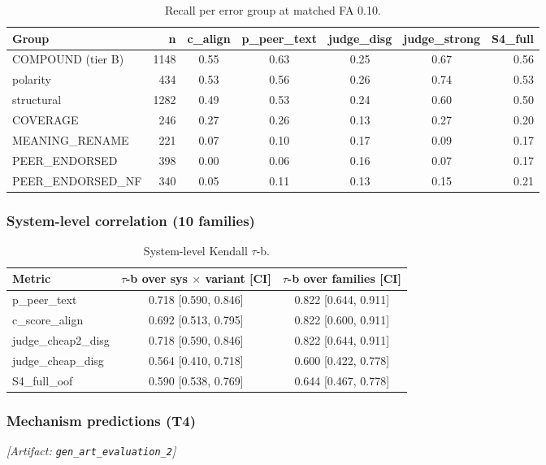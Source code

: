 \documentclass[11pt,letterpaper]{article}
\begin{document}
\begin{table}[!htbp]
\centering
\caption{Recall per error group at matched FA 0.10.}
\label{tab:recall_errorgroup}
\small
\begin{tabular}{lrccccr}
\toprule
Group & n & c\_align & p\_peer\_text & judge\_disg & judge\_strong & S4\_full \\
\midrule
COMPOUND (tier B) & 1148 & 0.55 & 0.63 & 0.25 & 0.67 & 0.56 \\
polarity & 434 & 0.53 & 0.56 & 0.26 & 0.74 & 0.53 \\
structural & 1282 & 0.49 & 0.53 & 0.24 & 0.60 & 0.50 \\
COVERAGE & 246 & 0.27 & 0.26 & 0.13 & 0.27 & 0.20 \\
MEANING\_RENAME & 221 & 0.07 & 0.10 & 0.17 & 0.09 & 0.17 \\
PEER\_ENDORSED & 398 & 0.00 & 0.06 & 0.16 & 0.07 & 0.17 \\
PEER\_ENDORSED\_NF & 340 & 0.05 & 0.11 & 0.13 & 0.15 & 0.21 \\
\bottomrule
\end{tabular}
\end{table}

\subsubsection{System-level correlation (10 families)}

\begin{table}[!htbp]
\centering
\caption{System-level Kendall $\tau$-b.}
\label{tab:system_tau}
\begin{tabular}{lcc}
\toprule
Metric & $\tau$-b over sys $\times$ variant [CI] & $\tau$-b over families [CI] \\
\midrule
p\_peer\_text & 0.718 [0.590, 0.846] & 0.822 [0.644, 0.911] \\
c\_score\_align & 0.692 [0.513, 0.795] & 0.822 [0.600, 0.911] \\
judge\_cheap2\_disg & 0.718 [0.590, 0.846] & 0.822 [0.644, 0.911] \\
judge\_cheap\_disg & 0.564 [0.410, 0.718] & 0.600 [0.422, 0.778] \\
S4\_full\_oof & 0.590 [0.538, 0.769] & 0.644 [0.467, 0.778] \\
\bottomrule
\end{tabular}
\end{table}

\subsubsection{Mechanism predictions (T4)}
\noindent\textit{[Artifact: \texttt{gen\_art\_evaluation\_2}]}
\end{document}
